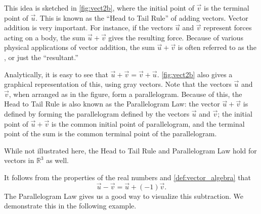This idea is sketched in \autoref{fig:vect2b}, where the initial point of $\vec v$ is the terminal point of $\vec u$. This is known as the ``Head to Tail Rule'' of adding vectors. Vector addition is very important. For instance, if the vectors $\vec u$ and $\vec v$ represent forces acting on a body, the sum $\vec u+\vec v$ gives the resulting force. Because of various physical applications of vector addition, the sum $\vec u+\vec v$ is often referred to as the , or just the ``resultant.''

Analytically, it is easy to see that $\vec u+\vec v = \vec v+\vec u$. \autoref{fig:vect2b} also gives a graphical representation of this, using gray vectors. Note that the vectors $\vec u$ and $\vec v$, when arranged as in the figure, form a parallelogram. Because of this, the Head to Tail Rule is also known as the Parallelogram Law: the vector $\vec u+\vec v$ is defined by forming the parallelogram defined by the vectors $\vec u$ and $\vec v$; the initial point of $\vec u+\vec v$ is the common initial point of parallelogram, and the terminal point of the sum is the common terminal point of the parallelogram.

While not illustrated here, the Head to Tail Rule and Parallelogram Law hold for vectors in $\mathbb{R}^3$ as well.

It follows from the properties of the real numbers and \autoref{def:vector_algebra} that $$\vec u-\vec v = \vec u + (-1)\vec v.$$ The Parallelogram Law gives us a good way to visualize this subtraction. We demonstrate this in the following example.\\



